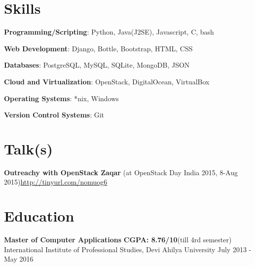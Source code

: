 \documentclass[margin,line]{resume}
\begin{document}
\begin{resume}
\begin{list2}
	\end{list2}

    \section{\mysidestyle Skills} 

    \begin{list2}
	\item \textbf{Programming/Scripting}: \hspace{3mm} Python, Java(J2SE), Javascript, C, bash
	\item \textbf{Web Development}: \hspace{13mm}  Django, Bottle, Bootstrap, HTML, CSS
	\item \textbf{Databases}: \hspace{28mm} PostgreSQL, MySQL, SQLite,	MongoDB, JSON
	\item \textbf{Cloud and Virtualization}: \hspace{1mm} OpenStack, DigitalOcean, VirtualBox
	\item \textbf{Operating Systems}: \hspace{12mm} *nix, Windows
    \item \textbf{Version Control Systems}: \hspace{2mm} Git
	\end{list2}

    \section{\mysidestyle Talk(s)}
    \begin{list2}
    \item \textbf{Outreachy with OpenStack Zaqar} (at OpenStack Day India 2015, 8-Aug 2015)\url{http://tinyurl.com/nomuog6}
    \end{list2}

    \section{\mysidestyle Education}

    \begin{list2}
	\item \textbf{Master of Computer Applications} \hspace{47mm} \textbf{CGPA: 8.76/10}(till 4rd semester) \\ International Institute of Professional Studies, Devi Ahilya University \hspace{17mm} July 2013 - May 2016
	\end{list2}


\end{resume}
\end{document}
